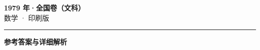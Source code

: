 \documentclass[zihao=5, a4paper]{ctexart}
\begin{document}
\begin{center}
  {\Large\bfseries 1979 年·全国卷（文科）}\\[4pt]
  {\large 数学 · 印刷版}
\end{center}
\medskip
{}

\par\bigskip\hrule\bigskip
{}
\begin{center}{\large\bfseries 参考答案与详细解析}\end{center}
\smallskip

\end{document}
